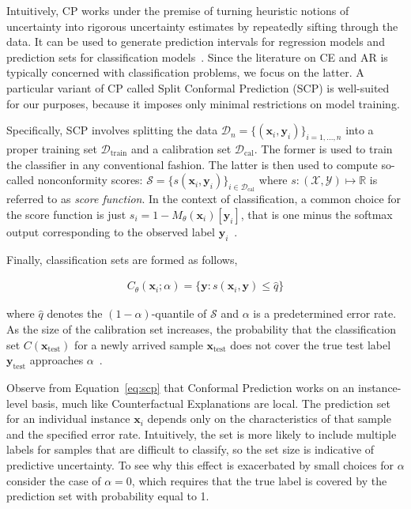 \documentclass{article}
\begin{document}
Intuitively, CP works under the premise of turning heuristic notions of uncertainty into rigorous uncertainty estimates by repeatedly sifting through the data. It can be used to generate prediction intervals for regression models and prediction sets for classification models~\citep{altmeyer2022conformal}. Since the literature on CE and AR is typically concerned with classification problems, we focus on the latter. A particular variant of CP called Split Conformal Prediction (SCP) is well-suited for our purposes, because it imposes only minimal restrictions on model training. 

Specifically, SCP involves splitting the data $\mathcal{D}_n=\{(\mathbf{x}_i,\mathbf{y}_i)\}_{i=1,...,n}$ into a proper training set $\mathcal{D}_{\text{train}}$ and a calibration set $\mathcal{D}_{\text{cal}}$. The former is used to train the classifier in any conventional fashion. The latter is then used to compute so-called nonconformity scores: $\mathcal{S}=\{s(\mathbf{x}_i,\mathbf{y}_i)\}_{i \in \mathcal{D}_{\text{cal}}}$ where $s: (\mathcal{X},\mathcal{Y}) \mapsto \mathbb{R}$ is referred to as \textit{score function}. In the context of classification, a common choice for the score function is just $s_i=1-M_{\theta}(\mathbf{x}_i)[\mathbf{y}_i]$, that is one minus the softmax output corresponding to the observed label $\mathbf{y}_i$~\citep{angelopoulos2021gentle}. 

Finally, classification sets are formed as follows,

\begin{equation}\label{eq:scp}
  \begin{aligned}
    C_{\theta}(\mathbf{x}_i;\alpha)=\{\mathbf{y}: s(\mathbf{x}_i,\mathbf{y}) \le \hat{q}\}
  \end{aligned}
\end{equation}

where $\hat{q}$ denotes the $(1-\alpha)$-quantile of $\mathcal{S}$ and $\alpha$ is a predetermined error rate. As the size of the calibration set increases, the probability that the classification set $C(\mathbf{x}_{\text{test}})$ for a newly arrived sample $\mathbf{x}_{\text{test}}$ does not cover the true test label $\mathbf{y}_{\text{test}}$ approaches $\alpha$~\citep{angelopoulos2021gentle}. 

Observe from Equation~\ref{eq:scp} that Conformal Prediction works on an instance-level basis, much like Counterfactual Explanations are local. The prediction set for an individual instance $\mathbf{x}_i$ depends only on the characteristics of that sample and the specified error rate. Intuitively, the set is more likely to include multiple labels for samples that are difficult to classify, so the set size is indicative of predictive uncertainty. To see why this effect is exacerbated by small choices for $\alpha$ consider the case of $\alpha=0$, which requires that the true label is covered by the prediction set with probability equal to 1.
\end{document}
